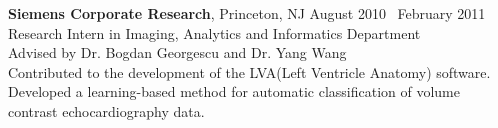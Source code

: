    \textbf{Siemens Corporate Research}, Princeton, NJ \hfill August 2010 \textendash ~February 2011\vspace{0mm}\\\vspace{0mm}
	\hspace{-1mm}Research Intern in Imaging, Analytics and Informatics Department  \hfill \vspace{0mm}\\\vspace{0mm}
	\hspace{-1mm}Advised by Dr. Bogdan Georgescu and Dr. Yang Wang \hfill \vspace{2mm}\\\vspace{0mm}
	\hspace{-1.4mm}Contributed to the development of the LVA(Left Ventricle Anatomy) software. Developed a learning-based method for automatic classification of volume contrast echocardiography data.